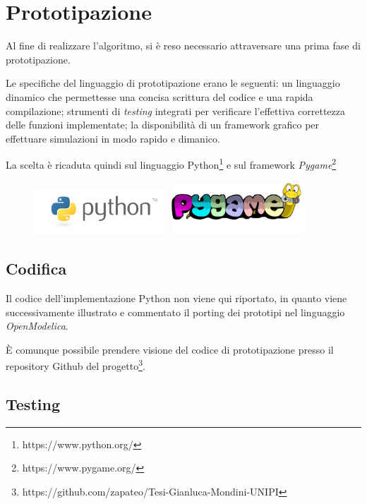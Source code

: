 \documentclass[11pt,a4paper]{report}
\begin{document}
\pagebreak

\chapter{Prototipazione}

Al fine di realizzare l'algoritmo, si è reso necessario attraversare una prima fase di prototipazione.

Le specifiche del linguaggio di prototipazione erano le seguenti: un linguaggio dinamico che permettesse una concisa scrittura del codice e una rapida compilazione; strumenti di \textit{testing} integrati per verificare l'effettiva correttezza delle funzioni implementate; la disponibilità di un framework grafico per effettuare simulazioni in modo rapido e dimanico.

La scelta è ricaduta quindi sul linguaggio Python\footnote{https://www.python.org/} e sul framework \textit{Pygame}\footnote{https://www.pygame.org/}

\begin{figure}[H]
\centering
\includegraphics[width=5cm]{python.png}
\includegraphics[width=5cm]{pygame.png}

\end{figure}

\section{Codifica}

Il codice dell'implementazione Python non viene qui riportato, in quanto viene successivamente illustrato e commentato il porting dei prototipi nel linguaggio \textit{OpenModelica}.

È comunque possibile prendere visione del codice di prototipazione presso il repository Github del progetto\footnote{https://github.com/zapateo/Tesi-Gianluca-Mondini-UNIPI}.


\section{Testing}
\end{document}
